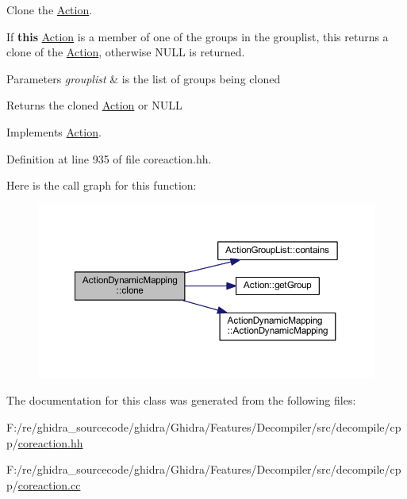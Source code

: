 Clone the \mbox{\hyperlink{class_action}{Action}}. 

If {\bfseries{this}} \mbox{\hyperlink{class_action}{Action}} is a member of one of the groups in the grouplist, this returns a clone of the \mbox{\hyperlink{class_action}{Action}}, otherwise N\+U\+LL is returned. 
\begin{DoxyParams}{Parameters}
{\em grouplist} & is the list of groups being cloned \\
\hline
\end{DoxyParams}
\begin{DoxyReturn}{Returns}
the cloned \mbox{\hyperlink{class_action}{Action}} or N\+U\+LL 
\end{DoxyReturn}


Implements \mbox{\hyperlink{class_action_af8242e41d09e5df52f97df9e65cc626f}{Action}}.



Definition at line 935 of file coreaction.\+hh.

Here is the call graph for this function\+:
\nopagebreak
\begin{figure}[H]
\begin{center}
\leavevmode
\includegraphics[width=350pt]{class_action_dynamic_mapping_a9c1315b992794205be6fc1ae3b419b16_cgraph}
\end{center}
\end{figure}


The documentation for this class was generated from the following files\+:\begin{DoxyCompactItemize}
\item 
F\+:/re/ghidra\+\_\+sourcecode/ghidra/\+Ghidra/\+Features/\+Decompiler/src/decompile/cpp/\mbox{\hyperlink{coreaction_8hh}{coreaction.\+hh}}\item 
F\+:/re/ghidra\+\_\+sourcecode/ghidra/\+Ghidra/\+Features/\+Decompiler/src/decompile/cpp/\mbox{\hyperlink{coreaction_8cc}{coreaction.\+cc}}\end{DoxyCompactItemize}
